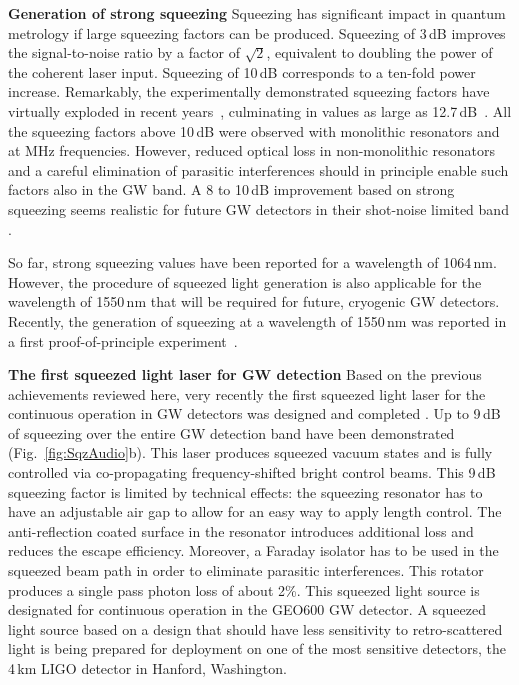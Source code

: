 \textbf{Generation of strong squeezing}\; Squeezing has significant
impact in quantum metrology if large squeezing factors can be
produced. Squeezing of 3\,dB improves the signal-to-noise ratio by a
factor of $\sqrt{2}$, equivalent to doubling the power of the
coherent laser input. Squeezing of 10\,dB corresponds to a ten-fold
power increase. Remarkably, the experimentally demonstrated
squeezing factors have virtually exploded in recent years~\cite{Takeno2007,Vahlbruch2008,Polzik2008}, culminating in values
as large as 12.7\,dB~\cite{Eberle2010}.
All the squeezing factors above
10\,dB were observed with monolithic resonators and at MHz
frequencies. However, reduced optical loss in non-monolithic resonators and a careful elimination of
parasitic interferences should in principle enable such factors
also in the GW band.  A 8 to 10\,dB improvement based on strong squeezing seems
realistic for future GW detectors in their shot-noise limited band \cite{Eberle2010}.

So far, strong squeezing values have been reported for a wavelength of 1064\,nm. However, the procedure of squeezed light generation is also applicable for the wavelength of 1550\,nm that will be required for future, cryogenic GW detectors.
Recently, the generation of  squeezing at a wavelength of 1550\,nm  was reported in a first proof-of-principle experiment~\cite{Mehmet2009}.



\textbf{The first squeezed light laser for GW detection}\; Based on
the previous achievements reviewed here, very recently the first
squeezed light laser for the continuous operation in GW detectors was
designed and completed \cite{VahlbruchPhD08,VahlbruchCQG2010}. Up to
9\,dB of squeezing over the entire GW detection band have been
demonstrated (Fig.~\ref{fig:SqzAudio}b). This laser produces squeezed vacuum
states and is fully controlled via co-propagating frequency-shifted bright control
beams. This 9\,dB squeezing factor is limited by technical effects:
the squeezing resonator has to have an adjustable air gap to allow
for an easy way to apply length control. The anti-reflection coated surface
in the resonator introduces additional loss and reduces the escape
efficiency. Moreover, a Faraday isolator has to be used in the
squeezed beam path in order to eliminate parasitic interferences.
This rotator produces a single pass photon loss of about 2\%. This
squeezed light source is designated for continuous operation in the
GEO600 GW detector. A squeezed light source based on a design that should have less sensitivity to retro-scattered light \cite{McKenzie2006} is being prepared for deployment on one of the most sensitive
detectors, the 4\,km LIGO detector in Hanford, Washington.

